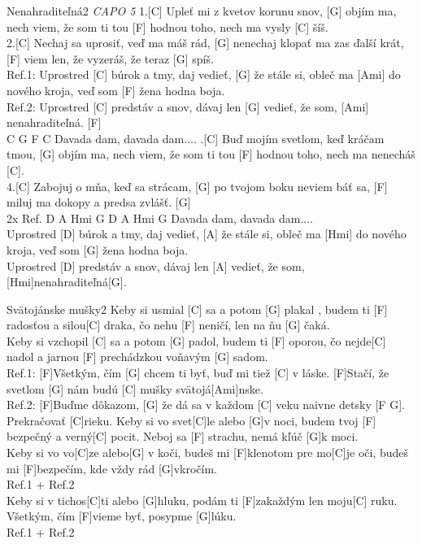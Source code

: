 \documentclass[12pt]{article}
\begin{document}
\begin{song}{Nenahraditeľná}{2}
	\textit{CAPO 5}
	1.[C] Upleť mi z kvetov korunu snov,
	[G] objím ma, nech viem, že som ti tou
	[F] hodnou toho,
	nech ma vysly [C] šíš.
	\\
	2.[C] Nechaj sa uprosiť, veď ma máš rád,
	[G] nenechaj klopať ma zas ďalší krát,
	[F] viem len, že vyzeráš,
	že teraz [G] spíš.
	\\
	Ref.1:
	Uprostred [C] búrok a tmy,
	daj vedieť, [G] že stále si,
	obleč ma [Ami] do nového kroja,
	veď som [F] žena hodna boja.
	\\
	Ref.2:
	Uprostred [C] predstáv a snov,
	dávaj len [G] vedieť, že som,
	[Ami] nenahraditeľná. [F]
	\\
	C G F C
	Davada dam, davada dam....
	.[C] Buď mojím svetlom, keď kráčam tmou,
	[G] objím ma, nech viem, že som ti tou
	[F] hodnou toho,
	nech ma nenecháš [C].
	\\
	4.[C] Zabojuj o mňa, keď sa strácam,
	[G] po tvojom boku neviem báť sa,
	[F] miluj ma dokopy a predsa zvlášť. [G]
	\\
	2x Ref. 
	D A Hmi G D A Hmi G
	Davada dam, davada dam....
	\\
	Uprostred [D] búrok a tmy,
	daj vedieť, [A] že stále si,
	obleč ma [Hmi] do nového kroja,
	veď som [G] žena hodna boja.
	\\
	Uprostred [D] predstáv a snov,
	dávaj len [A] vedieť, že som, 
	[Hmi]nenahraditeľná[G].
\end{song}

\begin{song}{Svätojánske mušky}{2}
	Keby si usmial [C] sa a potom [G] plakal ,
	budem ti [F] radosťou a silou[C] draka,
	čo nehu [F] neničí, len na ňu [G] čaká.
	\\
	Keby si vzchopil [C] sa a potom [G] padol,
	budem ti [F] oporou, čo nejde[C] nadol
	a jarnou [F] prechádzkou voňavým [G] sadom.
	\\
	Ref.1:
	[F]Všetkým, čím [G] chcem ti byť,
	buď mi tiež [C] v láske.
	[F]Stačí, že svetlom [G] nám
	budú [C] mušky svätojá[Ami]nske.
	\\
	Ref.2:
	[F]Buďme dôkazom, [G] že dá sa
	v každom [C] veku
	naivne detsky [F G].
	Prekračovať [C]rieku.
	\columnbreak
	Keby si vo svet[C]le alebo [G]v noci,
	budem tvoj [F] bezpečný a verný[C] pocit.
	Neboj sa [F] strachu, nemá kľúč [G]k moci.
	\\
	Keby si vo vo[C]ze alebo[G] v koči,
	budeš mi [F]klenotom pre mo[C]je oči,
	budeš mi [F]bezpečím, kde vždy rád [G]vkročím.
	\\
	Ref.1 + Ref.2
	\\
	Keby si v tichos[C]ti alebo [G]hluku,
	podám ti [F]zakaždým len moju[C] ruku.
	Všetkým, čím [F]vieme byť, posypme [G]lúku.
	\\
	Ref.1 + Ref.2
\end{song}
	
\end{document}
